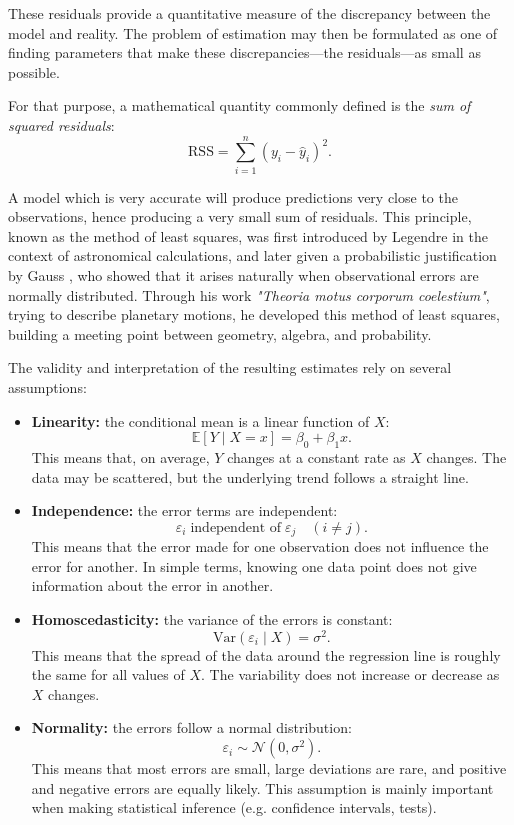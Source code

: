 These residuals provide a quantitative measure of the discrepancy between the model and reality. The problem of estimation may then be formulated as one of finding parameters that make these discrepancies—the residuals—as small as possible.

\medskip

For that purpose, a mathematical quantity commonly defined is the \textit{sum of squared residuals}:
\[
\mathrm{RSS} = \sum_{i=1}^n (y_i - \hat{y}_i)^2.
\]

A model which is very accurate will produce predictions very close to the observations, hence producing a very small sum of residuals. This principle, known as the method of least squares, was first introduced by Legendre \cite{legendre_1805_least} in the context of astronomical calculations, and later given a probabilistic justification by Gauss \cite{gauss_1809_theoria}, who showed that it arises naturally when observational errors are normally distributed. Through his work \textit{"Theoria motus corporum coelestium"}, trying to describe planetary motions, he developed this method of least squares, building a meeting point between geometry, algebra, and probability.

\medskip

The validity and interpretation of the resulting estimates rely on several assumptions:

\begin{itemize}

\item \textbf{Linearity:} the conditional mean is a linear function of \(X\):
    \[
        \mathbb{E}[Y \mid X=x] = \beta_0 + \beta_1 x.
    \]
    This means that, on average, \(Y\) changes at a constant rate as \(X\) changes. The data may be scattered, but the underlying trend follows a straight line.

\item \textbf{Independence:} the error terms are independent:
    \[
        \varepsilon_i \;\text{independent of}\; \varepsilon_j \quad (i \neq j).
    \]
    This means that the error made for one observation does not influence the error for another. In simple terms, knowing one data point does not give information about the error in another.

\item \textbf{Homoscedasticity:} the variance of the errors is constant:
    \[
        \mathrm{Var}(\varepsilon_i \mid X) = \sigma^2.
    \]
    This means that the spread of the data around the regression line is roughly the same for all values of \(X\). The variability does not increase or decrease as \(X\) changes.

\item \textbf{Normality:} the errors follow a normal distribution:
    \[
        \varepsilon_i \sim \mathcal{N}(0,\sigma^2).
    \]
    This means that most errors are small, large deviations are rare, and positive and negative errors are equally likely. This assumption is mainly important when making statistical inference (e.g. confidence intervals, tests).

\end{itemize}

